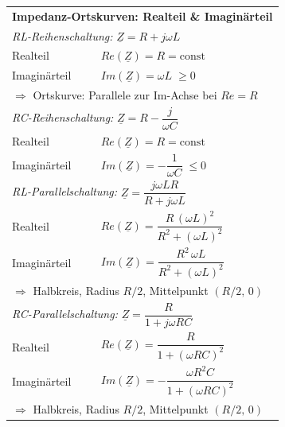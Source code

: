\documentclass[a4paper,12pt]{scrartcl}
\begin{document}
\begin{tabular}{@{} l l @{}}
\multicolumn{2}{l}{\textbf{Impedanz-Ortskurven: Realteil \& Imaginärteil}} \\[1mm]
\multicolumn{2}{l}{\textit{RL-Reihenschaltung:} \enspace $\underline{Z} = R + j\omega L$} \\
\hspace*{20mm} Realteil & $Re(\underline{Z}) = R = \text{const}$ \\
\hspace*{20mm} Imaginärteil & $Im(\underline{Z}) = \omega L \;\geq 0$ \\
\multicolumn{2}{l}{\quad $\Rightarrow$ Ortskurve: Parallele zur $\mathrm{Im}$-Achse bei $Re = R$} \\[2mm]
\multicolumn{2}{l}{\textit{RC-Reihenschaltung:} \enspace $\underline{Z} = R - \dfrac{j}{\omega C}$} \\
\hspace*{20mm} Realteil & $Re(\underline{Z}) = R = \text{const}$ \\
\hspace*{20mm} Imaginärteil & $Im(\underline{Z}) = -\dfrac{1}{\omega C} \;\leq 0$ \\[2mm]
\multicolumn{2}{l}{\textit{RL-Parallelschaltung:} \enspace $\underline{Z} = \dfrac{j\omega LR}{R + j\omega L}$} \\
\hspace*{20mm} Realteil & $Re(\underline{Z}) = \dfrac{R\,(\omega L)^2}{R^2 + (\omega L)^2}$ \\
\hspace*{20mm} Imaginärteil & $Im(\underline{Z}) = \dfrac{R^2\,\omega L}{R^2 + (\omega L)^2}$ \\
\multicolumn{2}{l}{\quad $\Rightarrow$ Halbkreis, Radius $R/2$, Mittelpunkt $(R/2,\,0)$} \\[2mm]
\multicolumn{2}{l}{\textit{RC-Parallelschaltung:} \enspace $\underline{Z} = \dfrac{R}{1 + j\omega RC}$} \\
\hspace*{20mm} Realteil & $Re(\underline{Z}) = \dfrac{R}{1 + (\omega RC)^2}$ \\
\hspace*{20mm} Imaginärteil & $Im(\underline{Z}) = -\dfrac{\omega R^2 C}{1 + (\omega RC)^2}$ \\
\multicolumn{2}{l}{\quad $\Rightarrow$ Halbkreis, Radius $R/2$, Mittelpunkt $(R/2,\,0)$} \\

\end{tabular}
\end{document}
